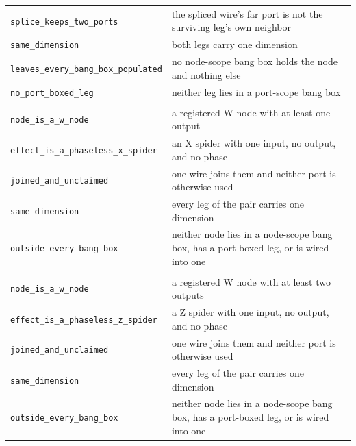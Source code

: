 \begin{xltabular}{\textwidth}{@{}>{\raggedright\arraybackslash}p{0.42\textwidth}>{\raggedright\arraybackslash}X@{}}
\quad\texttt{splice\_\allowbreak{}keeps\_\allowbreak{}two\_\allowbreak{}ports} & the spliced wire's far port is not the surviving leg's own neighbor \\
\quad\texttt{same\_\allowbreak{}dimension} & both legs carry one dimension \\
\quad\texttt{leaves\_\allowbreak{}every\_\allowbreak{}bang\_\allowbreak{}box\_\allowbreak{}populated} & no node-scope bang box holds the node and nothing else \\
\quad\texttt{no\_\allowbreak{}port\_\allowbreak{}boxed\_\allowbreak{}leg} & neither leg lies in a port-scope bang box \\
\midrule
{}\\
\quad\texttt{node\_\allowbreak{}is\_\allowbreak{}a\_\allowbreak{}w\_\allowbreak{}node} & a registered W node with at least one output \\
\quad\texttt{effect\_\allowbreak{}is\_\allowbreak{}a\_\allowbreak{}phaseless\_\allowbreak{}x\_\allowbreak{}spider} & an X spider with one input, no output, and no phase \\
\quad\texttt{joined\_\allowbreak{}and\_\allowbreak{}unclaimed} & one wire joins them and neither port is otherwise used \\
\quad\texttt{same\_\allowbreak{}dimension} & every leg of the pair carries one dimension \\
\quad\texttt{outside\_\allowbreak{}every\_\allowbreak{}bang\_\allowbreak{}box} & neither node lies in a node-scope bang box, has a port-boxed leg, or is wired into one \\
\midrule
{}\\
\quad\texttt{node\_\allowbreak{}is\_\allowbreak{}a\_\allowbreak{}w\_\allowbreak{}node} & a registered W node with at least two outputs \\
\quad\texttt{effect\_\allowbreak{}is\_\allowbreak{}a\_\allowbreak{}phaseless\_\allowbreak{}z\_\allowbreak{}spider} & a Z spider with one input, no output, and no phase \\
\quad\texttt{joined\_\allowbreak{}and\_\allowbreak{}unclaimed} & one wire joins them and neither port is otherwise used \\
\quad\texttt{same\_\allowbreak{}dimension} & every leg of the pair carries one dimension \\
\quad\texttt{outside\_\allowbreak{}every\_\allowbreak{}bang\_\allowbreak{}box} & neither node lies in a node-scope bang box, has a port-boxed leg, or is wired into one \\

\end{xltabular}
